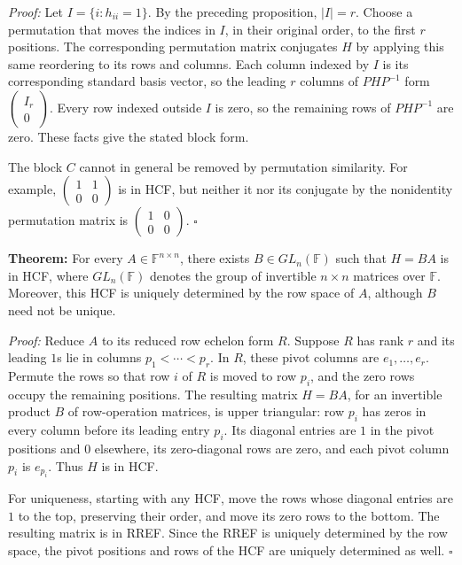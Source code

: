 \documentclass[a4paper,11pt,abstract=true]{scrartcl}
\theoremstyle{dotlessP}
\theoremstyle{dotlessS}
\theoremstyle{remark}
\theoremstyle{definition}
\begin{document}
\begin{claim_box}
\textit{Proof:} Let $I=\{i:h_{ii}=1\}$. By the preceding proposition,
$|I|=r$. Choose a permutation that moves the indices in $I$, in their
original order, to the first $r$ positions. The corresponding
permutation matrix conjugates $H$ by applying this same reordering to
its rows and columns. Each column indexed by $I$ is its corresponding
standard basis vector, so the leading $r$ columns of $PHP^{-1}$ form
$\begin{pmatrix}I_r\\0\end{pmatrix}$. Every row indexed outside $I$
is zero, so the remaining rows of $PHP^{-1}$ are zero. These facts give
the stated block form.

The block $C$ cannot in general be removed by permutation similarity.
For example, $\begin{pmatrix}1&1\\0&0\end{pmatrix}$ is in HCF, but
neither it nor its conjugate by the nonidentity permutation matrix is
$\begin{pmatrix}1&0\\0&0\end{pmatrix}$.
\hfill$\square$
\end{claim_box}

\begin{problem_box}
\textbf{Theorem:} For every $A\in\mathbb{F}^{n\times n}$, there
exists $B\in GL_n(\mathbb{F})$ such that $H=BA$ is in HCF, where
$GL_n(\mathbb{F})$ denotes the group of invertible $n\times n$ matrices
over $\mathbb{F}$. Moreover, this HCF is uniquely determined by the
row space of $A$, although $B$ need not be unique.
\end{problem_box}

\begin{claim_box}
\textit{Proof:} Reduce $A$ to its reduced row echelon form $R$. Suppose
$R$ has rank $r$ and its leading $1$s lie in columns
$p_1<\cdots<p_r$. In $R$, these pivot columns are
$e_1,\ldots,e_r$. Permute the rows so that row $i$ of $R$ is moved to
row $p_i$, and the zero rows occupy the remaining positions. The
resulting matrix $H=BA$, for an invertible product $B$ of row-operation
matrices, is upper triangular: row $p_i$ has zeros in every column
before its leading entry $p_i$. Its diagonal entries are $1$ in the
pivot positions and $0$ elsewhere, its zero-diagonal rows are zero,
and each pivot column $p_i$ is $e_{p_i}$. Thus $H$ is in HCF.

For uniqueness, starting with any HCF, move the rows whose diagonal
entries are $1$ to the top, preserving their order, and move its zero
rows to the bottom. The resulting matrix is in RREF. Since the RREF
is uniquely determined by the row space, the pivot positions and rows
of the HCF are uniquely determined as well.
\hfill$\square$
\end{claim_box}
\end{document}
